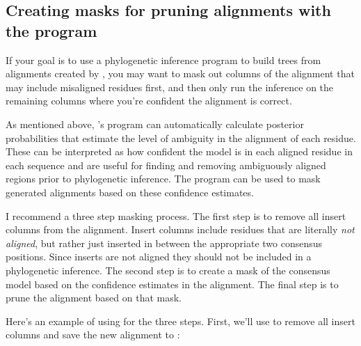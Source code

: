 \subsection{Creating masks for pruning alignments with the
   program}

If your goal is to use a phylogenetic inference program to build trees
from alignments created by , you may want to mask
out columns of the alignment that may include misaligned residues
first, and then only run the inference on the remaining columns where
you're confident the alignment is correct. 

As mentioned above, 's  program
can automatically calculate posterior probabilities that estimate the
level of ambiguity in the alignment of each residue. These can be
interpreted as how confident the model is in each aligned residue in
each sequence and are useful for finding and
removing ambiguously aligned regions prior to phylogenetic inference.
The  program can be used to mask
 generated alignments based on these confidence estimates.

I recommend a three step masking process. The first step is to remove
all insert columns from the alignment. Insert columns include residues
that are literally \emph{not aligned}, but rather just inserted in
between the appropriate two consensus positions. 
Since inserts are
not aligned they should not be included in a phylogenetic inference.
The second step is to create a mask of the consensus model based on
the confidence estimates in the alignment. The final step is to prune
the alignment based on that mask.

Here's an example of using  for the three steps. 
First, we'll use  to remove all insert columns and
save the new alignment to :



